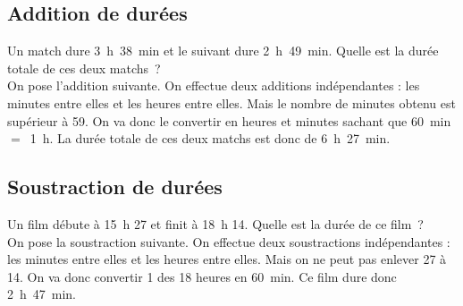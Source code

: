 \subsection{Addition de durées}

\begin{exemple*1}
Un match dure 3 h 38 min et le suivant dure 2 h 49 min. Quelle est la durée totale de ces deux matchs ? \\[1em]
On pose l'addition suivante.
On effectue deux additions indépendantes : 
les minutes entre elles et les heures entre elles.
Mais le nombre de minutes obtenu est supérieur à 59. 
On va donc le convertir en heures et minutes sachant que 60 min $=$ 1 h. 
La durée totale de ces deux matchs est donc de 6 h 27 min.
\end{exemple*1}

\subsection{Soustraction de durées}

\begin{exemple*1}
Un film débute à 15 h 27 et finit à 18 h 14. Quelle est la durée de ce film ? \\[1em]
On pose la soustraction suivante.
On effectue deux soustractions indépendantes : 
les minutes entre elles et les heures entre elles.
Mais on ne peut pas enlever 27 à 14. 
On va donc convertir 1 des 18 heures en 60 min. 
Ce film dure donc 2 h 47 min.
\end{exemple*1}

